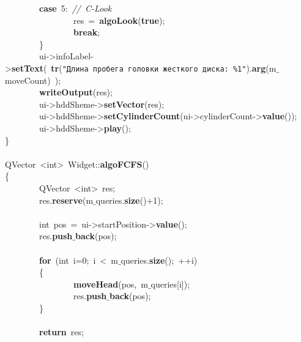 \mbox{}\ \ \ \ \ \ \ \ \textbf{case}\ 5:\ \textit{//\ C-Look} \\
\mbox{}\ \ \ \ \ \ \ \ \ \ \ \ \ \ \ \ res\ =\ \textbf{algoLook}(\textbf{true}); \\
\mbox{}\ \ \ \ \ \ \ \ \ \ \ \ \ \ \ \ \textbf{break}; \\
\mbox{}\ \ \ \ \ \ \ \ \} \\
\mbox{}\ \ \ \ \ \ \ \ ui-\textgreater{}infoLabel-\textgreater{}\textbf{setText}(\ \textbf{tr}(\texttt{"{}Длина\ пробега\ головки\ жесткого\ диска:\ \%1"{}}).\textbf{arg}(m$\_$moveCount)\ ); \\
\mbox{}\ \ \ \ \ \ \ \ \textbf{writeOutput}(res); \\
\mbox{}\ \ \ \ \ \ \ \ ui-\textgreater{}hddSheme-\textgreater{}\textbf{setVector}(res); \\
\mbox{}\ \ \ \ \ \ \ \ ui-\textgreater{}hddSheme-\textgreater{}\textbf{setCylinderCount}(ui-\textgreater{}cylinderCount-\textgreater{}\textbf{value}()); \\
\mbox{}\ \ \ \ \ \ \ \ ui-\textgreater{}hddSheme-\textgreater{}\textbf{play}(); \\
\mbox{}\} \\
\mbox{} \\
\mbox{}QVector\ \textless{}int\textgreater{}\ Widget::\textbf{algoFCFS}() \\
\mbox{}\{ \\
\mbox{}\ \ \ \ \ \ \ \ QVector\ \textless{}int\textgreater{}\ res; \\
\mbox{}\ \ \ \ \ \ \ \ res.\textbf{reserve}(m$\_$queries.\textbf{size}()+1); \\
\mbox{} \\
\mbox{}\ \ \ \ \ \ \ \ int\ pos\ =\ ui-\textgreater{}startPosition-\textgreater{}\textbf{value}(); \\
\mbox{}\ \ \ \ \ \ \ \ res.\textbf{push$\_$back}(pos); \\
\mbox{} \\
\mbox{}\ \ \ \ \ \ \ \ \textbf{for}\ (int\ i=0;\ i\ \textless{}\ m$\_$queries.\textbf{size}();\ ++i) \\
\mbox{}\ \ \ \ \ \ \ \ \{ \\
\mbox{}\ \ \ \ \ \ \ \ \ \ \ \ \ \ \ \ \textbf{moveHead}(pos,\ m$\_$queries[i]); \\
\mbox{}\ \ \ \ \ \ \ \ \ \ \ \ \ \ \ \ res.\textbf{push$\_$back}(pos); \\
\mbox{}\ \ \ \ \ \ \ \ \} \\
\mbox{} \\
\mbox{}\ \ \ \ \ \ \ \ \textbf{return}\ res; \\
